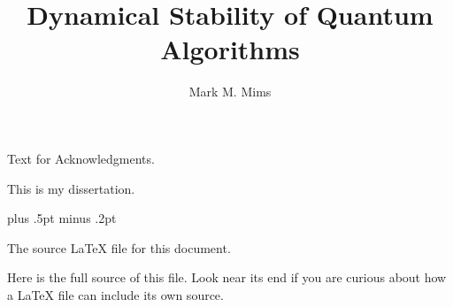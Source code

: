 \documentclass[12pt]{report} %
\author{Mark M. Mims}  %
\title{Dynamical Stability of Quantum Algorithms}
\theoremstyle{definition}
\theoremstyle{remark}
\begin{document}
\copyrightpage                  %

\titlepage                      %

\signaturepage                  %




\begin{acknowledgments}
%
Text for Acknowledgments.
\end{acknowledgments}

\utabstract       %

This is my dissertation.


\tableofcontents        %

\listoftables           %

\listoffigures          %











\baselineskip=15.5pt plus .5pt minus .2pt



\appendix
{}%

The source \LaTeX{} file for this document.

Here is the full source of this file. Look near its 
end if you are curious about how a \LaTeX{} file can 
include its own source.
\end{document}
